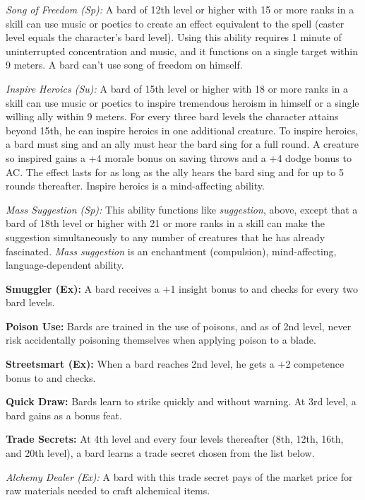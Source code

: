 \textit{Song of Freedom (Sp):} A bard of 12th level or higher with 15 or more ranks in a  skill can use music or poetics to create an effect equivalent to the  spell (caster level equals the character's bard level). Using this ability requires 1 minute of uninterrupted concentration and music, and it functions on a single target within 9 meters. A bard can't use song of freedom on himself.

\textit{Inspire Heroics (Su):} A bard of 15th level or higher with 18 or more ranks in a  skill can use music or poetics to inspire tremendous heroism in himself or a single willing ally within 9 meters. For every three bard levels the character attains beyond 15th, he can inspire heroics in one additional creature. To inspire heroics, a bard must sing and an ally must hear the bard sing for a full round. A creature so inspired gains a +4 morale bonus on saving throws and a +4 dodge bonus to AC. The effect lasts for as long as the ally hears the bard sing and for up to 5 rounds thereafter. Inspire heroics is a mind-affecting ability.

\textit{Mass Suggestion (Sp):} This ability functions like \emph{suggestion}, above, except that a bard of 18th level or higher with 21 or more ranks in a  skill can make the suggestion simultaneously to any number of creatures that he has already fascinated. \emph{Mass suggestion} is an enchantment (compulsion), mind-affecting, language-dependent ability.

\textbf{Smuggler (Ex):} A bard receives a +1 insight bonus to  and  checks for every two bard levels.

\textbf{Poison Use:} Bards are trained in the use of poisons, and as of 2nd level, never risk accidentally poisoning themselves when applying poison to a blade.

\textbf{Streetsmart (Ex):} When a bard reaches 2nd level, he gets a +2 competence bonus to  and  checks.

\textbf{Quick Draw:} Bards learn to strike quickly and without warning. At 3rd level, a bard gains  as a bonus feat.

\textbf{Trade Secrets:} At 4th level and every four levels thereafter (8th, 12th, 16th, and 20th level), a bard learns a trade secret chosen from the list below.

\textit{Alchemy Dealer (Ex):} A bard with this trade secret pays \onehalf of the market price for raw materials needed to craft alchemical items.

